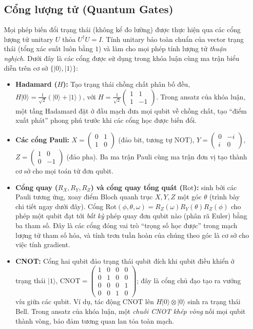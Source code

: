 \subsection{Cổng lượng tử (Quantum Gates)}
Mọi phép biến đổi trạng thái (không kể đo lường) được thực hiện qua các cổng lượng tử unitary $U$ thỏa $U^\dagger U = I$. Tính unitary bảo toàn chuẩn của vector trạng thái (tổng xác suất luôn bằng $1$) và làm cho mọi phép tính lượng tử \emph{thuận nghịch}. Dưới đây là các cổng được sử dụng trong khóa luận cùng ma trận biểu diễn trên cơ sở $\{|0\rangle,|1\rangle\}$:
\begin{itemize}
    \item \textbf{Hadamard ($H$):} Tạo trạng thái chồng chất phân bố đều, $H|0\rangle = \tfrac{1}{\sqrt{2}}(|0\rangle+|1\rangle)$, với
    $H=\tfrac{1}{\sqrt{2}}\left(\begin{smallmatrix}1 & 1\\ 1 & -1\end{smallmatrix}\right)$. Trong ansatz của khóa luận, một tầng Hadamard đặt ở đầu mạch đưa mọi qubit về chồng chất, tạo ``điểm xuất phát'' phong phú trước khi các cổng học được biến đổi.
    \item \textbf{Các cổng Pauli:} $X=\left(\begin{smallmatrix}0 & 1\\ 1 & 0\end{smallmatrix}\right)$ (đảo bit, tương tự NOT), $Y=\left(\begin{smallmatrix}0 & -i\\ i & 0\end{smallmatrix}\right)$, $Z=\left(\begin{smallmatrix}1 & 0\\ 0 & -1\end{smallmatrix}\right)$ (đảo pha). Ba ma trận Pauli cùng ma trận đơn vị tạo thành cơ sở cho mọi toán tử đơn qubit.
    \item \textbf{Cổng quay ($R_X, R_Y, R_Z$) và cổng quay tổng quát ($\text{Rot}$):} sinh bởi các Pauli tương ứng, xoay điểm Bloch quanh trục $X, Y, Z$ một góc $\theta$ (trình bày chi tiết ngay dưới đây). Cổng $\text{Rot}(\phi,\theta,\omega)=R_Z(\omega)R_Y(\theta)R_Z(\phi)$ cho phép một qubit đạt tới \emph{bất kỳ} phép quay đơn qubit nào (phân rã Euler) bằng ba tham số. Đây là các cổng đóng vai trò ``trọng số học được'' trong mạch lượng tử tham số hóa, và tính trơn tuần hoàn của chúng theo góc là cơ sở cho việc tính gradient.
    \item \textbf{CNOT:} Cổng hai qubit đảo trạng thái qubit đích khi qubit điều khiển ở trạng thái $|1\rangle$,
    $\text{CNOT}=\left(\begin{smallmatrix}1&0&0&0\\0&1&0&0\\0&0&0&1\\0&0&1&0\end{smallmatrix}\right)$; đây là cổng chủ đạo tạo ra vướng víu giữa các qubit. Ví dụ, tác động $\text{CNOT}$ lên $H|0\rangle\otimes|0\rangle$ sinh ra trạng thái Bell. Trong ansatz của khóa luận, một \emph{chuỗi CNOT khép vòng} nối mọi qubit thành vòng, bảo đảm tương quan lan tỏa toàn mạch.
\end{itemize}

